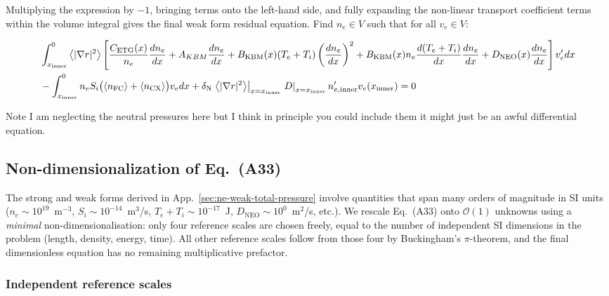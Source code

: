\documentclass[twocolumn,secnumarabic,amssymb, nobibnotes, aps, prd]{revtex4-2}
\renewcommand{\ne}{n_{e}}  %
\newcommand{\nfc}{n_{\mathrm{FC}}}
\newcommand{\ncx}{n_{\mathrm{CX}}}
\newcommand{\Si}{S_{i}}
\newcommand{\fsa}[1]{\left\langle #1 \right\rangle}
\newcommand{\gradrsq}{\fsa{|\nabla r|^{2}}}
\newcommand{\xin}{x_{\mathrm{inner}}}
\begin{document}
Multiplying the expression by $-1$, bringing terms onto the left-hand side, and fully expanding the non-linear transport coefficient terms within the volume integral gives the final weak form residual equation. Find $\ne \in V$ such that for all $v_e \in V$:
\begin{widetext}
\begin{align}
&\int_{\xin}^{0} \gradrsq \left[ \frac{C_{\mathrm{ETG}}(x)}{\ne} \frac{d\ne}{dx} + A_{KBM}\frac{dn_e}{dx}+ B_{\mathrm{KBM}}(x) (T_e + T_i) \left(\frac{d\ne}{dx}\right)^2 + B_{\mathrm{KBM}}(x) \ne \frac{d(T_e + T_i)}{dx} \frac{d\ne}{dx} + D_{\mathrm{NEO}}(x) \frac{d\ne}{dx} \right] v_e'  dx 
\notag \\ & - \int_{\xin}^{0} \ne\Si\bigl(\fsa{\nfc}+\fsa{\ncx}\bigr) v_e dx + \delta_{\mathrm{N}}\left. \gradrsq\right|_{x=\xin} \left. D \right|_{x=\xin} n'_{e,\mathrm{inner}} v_e(\xin) = 0
\end{align}
\end{widetext}

Note I am neglecting the neutral pressures here but I think in principle you could include them it might just be an awful differential equation.



\subsection{Non-dimensionalization of Eq.~(A33)}
\label{sec:nondim-A33}

The strong and weak forms derived in App.~\ref{sec:ne-weak-total-pressure}
involve quantities that span many orders of magnitude in SI units
($\ne \!\sim\! 10^{19}$~m$^{-3}$, $\Si \!\sim\! 10^{-14}$~m$^{3}$/s,
$T_{e}\!+\!T_{i} \!\sim\! 10^{-17}$~J,
$D_{\mathrm{NEO}} \!\sim\! 10^{0}$~m$^{2}$/s, etc.). We rescale
Eq.~(A33) onto $\mathcal{O}(1)$ unknowns using a \emph{minimal}
non-dimensionalisation: only four reference scales are chosen freely,
equal to the number of independent SI dimensions in the problem
(length, density, energy, time). All other reference scales follow
from those four by Buckingham's $\pi$-theorem, and the final
dimensionless equation has no remaining multiplicative prefactor.

\subsubsection{Independent reference scales}
\end{document}
